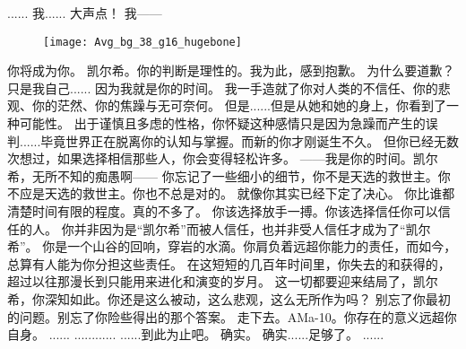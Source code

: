 \documentclass[openany]{book}
\begin{document}
\begin{dialogue}
     ......
     我......
     大声点！
     我——
    \begin{figure}[h]
        \centering
        \texttt{[image: Avg\_bg\_38\_g16\_hugebone]}
    \end{figure}
     你将成为你。
     凯尔希。你的判断是理性的。我为此，感到抱歉。
     为什么要道歉？
     只是我自己......
     因为我就是你的时间。
     我一手造就了你对人类的不信任、你的悲观、你的茫然、你的焦躁与无可奈何。
     但是......但是从她和她的身上，你看到了一种可能性。
     出于谨慎且多虑的性格，你怀疑这种感情只是因为急躁而产生的误判......毕竟世界正在脱离你的认知与掌握。而新的你才刚诞生不久。
     但你已经无数次想过，如果选择相信那些人，你会变得轻松许多。
     ——我是你的时间。凯尔希，无所不知的痴愚啊——
     你忘记了一些细小的细节，你不是天选的救世主。你不应是天选的救世主。你也不总是对的。
     就像你其实已经下定了决心。
     你比谁都清楚时间有限的程度。真的不多了。
     你该选择放手一搏。你该选择信任你可以信任的人。
     你并非因为是“凯尔希”而被人信任，也并非受人信任才成为了“凯尔希”。
     你是一个山谷的回响，穿岩的水滴。你肩负着远超你能力的责任，而如今，总算有人能为你分担这些责任。
     在这短短的几百年时间里，你失去的和获得的，超过以往那漫长到只能用来进化和演变的岁月。
     这一切都要迎来结局了，凯尔希，你深知如此。你还是这么被动，这么悲观，这么无所作为吗？
     别忘了你最初的问题。别忘了你险些得出的那个答案。
     走下去。AMa-10。你存在的意义远超你自身。
     ......
     ............
     ......到此为止吧。
     确实。
     确实......足够了。
     ......
\end{dialogue}
\end{document}

